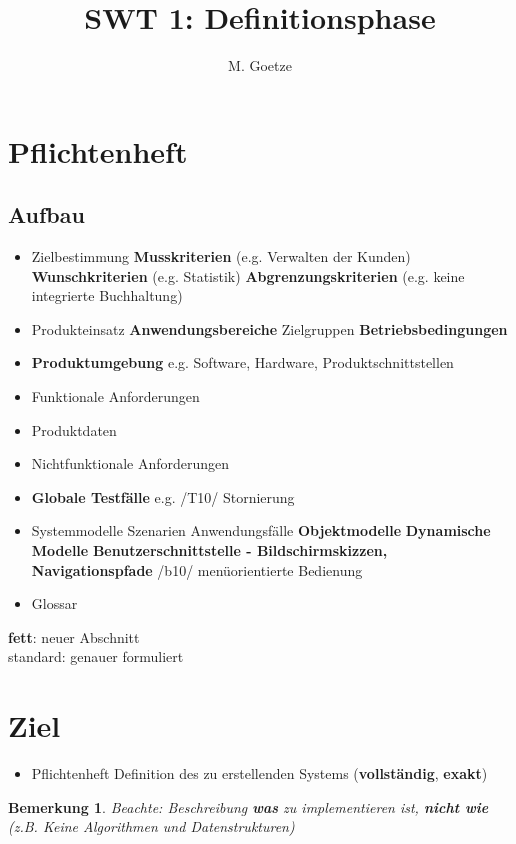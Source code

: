\documentclass[a4paper]{article}
\title{SWT 1: Definitionsphase}
\author{M. Goetze}
\theoremstyle{break}
\newtheorem{ann}{Bemerkung}[section]
\begin{document}
	\maketitle
	\tableofcontents
	\newpage
\section{Pflichtenheft}
\subsection{Aufbau}
	\begin{itemize}
		\item Zielbestimmung
		\subitem \textbf{Musskriterien} (e.g. Verwalten der Kunden)
		\subitem \textbf{Wunschkriterien} (e.g. Statistik)
		\subitem \textbf{Abgrenzungskriterien} (e.g. keine integrierte Buchhaltung)
		\item Produkteinsatz
		\subitem \textbf{Anwendungsbereiche}
		\subitem Zielgruppen
		\subitem \textbf{Betriebsbedingungen}
		\item \textbf{Produktumgebung}
		\subitem e.g. Software, Hardware, Produktschnittstellen
		\item Funktionale Anforderungen
		\item Produktdaten
		\item Nichtfunktionale Anforderungen
		\item \textbf{Globale Testfälle}
		\subitem e.g. /T10/ Stornierung
		\item Systemmodelle
		\subitem Szenarien
		\subitem Anwendungsfälle
		\subitem \textbf{Objektmodelle}
		\subitem \textbf{Dynamische Modelle}
		\subitem \textbf{Benutzerschnittstelle - Bildschirmskizzen, Navigationspfade}
		\subitem /b10/ menüorientierte Bedienung
		\item Glossar
	\end{itemize}

	\textbf{fett}: neuer Abschnitt \\
	standard: genauer formuliert
\section{Ziel}
\begin{itemize}
	\item Pflichtenheft
	\subitem Definition des zu erstellenden Systems (\textbf{vollständig}, \textbf{exakt})
\end{itemize}
\begin{ann}
	Beachte: Beschreibung \textbf{was} zu implementieren ist, \textbf{nicht wie} (z.B. Keine Algorithmen und Datenstrukturen)
\end{ann}
\end{document}
